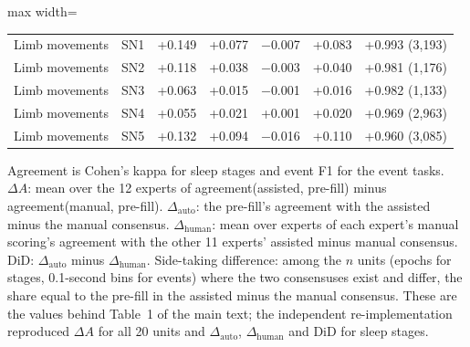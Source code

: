 \begin{table}[h!]
\begin{adjustbox}{max width=\linewidth}
\begin{tabular}{llccccc}
Limb movements & SN1 & +0.149 & +0.077 & \ensuremath{-}0.007 & +0.083 & +0.993 (3{,}193) \\
Limb movements & SN2 & +0.118 & +0.038 & \ensuremath{-}0.003 & +0.040 & +0.981 (1{,}176) \\
Limb movements & SN3 & +0.063 & +0.015 & \ensuremath{-}0.001 & +0.016 & +0.982 (1{,}133) \\
Limb movements & SN4 & +0.055 & +0.021 & +0.001 & +0.020 & +0.969 (2{,}963) \\
Limb movements & SN5 & +0.132 & +0.094 & \ensuremath{-}0.016 & +0.110 & +0.960 (3{,}085) \\
\bottomrule
\end{tabular}
\end{adjustbox}
\par\smallskip
\begin{minipage}{0.95\linewidth}\footnotesize Agreement is Cohen's kappa for sleep stages and event F1 for the event tasks. $\Delta A$: mean over the 12 experts of agreement(assisted, pre-fill) minus agreement(manual, pre-fill). $\Delta_{\mathrm{auto}}$: the pre-fill's agreement with the assisted minus the manual consensus. $\Delta_{\mathrm{human}}$: mean over experts of each expert's manual scoring's agreement with the other 11 experts' assisted minus manual consensus. DiD: $\Delta_{\mathrm{auto}}$ minus $\Delta_{\mathrm{human}}$. Side-taking difference: among the $n$ units (epochs for stages, 0.1-second bins for events) where the two consensuses exist and differ, the share equal to the pre-fill in the assisted minus the manual consensus. These are the values behind Table~1 of the main text; the independent re-implementation reproduced $\Delta A$ for all 20 units and $\Delta_{\mathrm{auto}}$, $\Delta_{\mathrm{human}}$ and DiD for sleep stages.\end{minipage}
\end{table}
